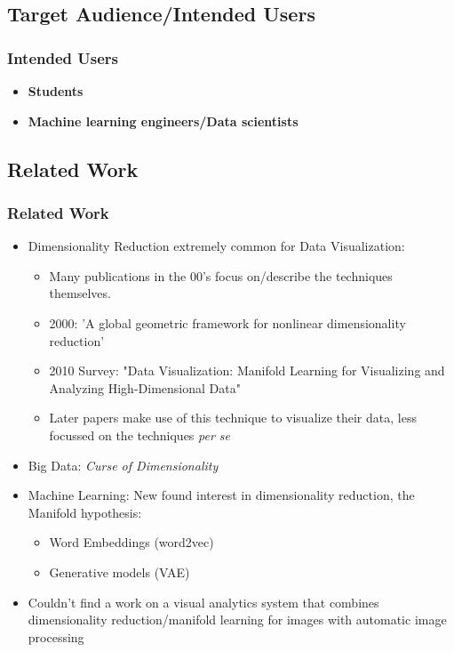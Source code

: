 \documentclass[aspectratio=1610]{beamer}
\begin{document}
\subsection {Target Audience/Intended Users}
\begin{frame}
  \frametitle{Intended Users}

  \begin{itemize}
      \item \textbf{Students} %
      \item \textbf{Machine learning engineers/Data scientists}  %
  \end{itemize}

\end{frame}

\subsection {Related Work}
\begin{frame}
  \frametitle{Related Work}
  \begin{itemize}
    \item Dimensionality Reduction extremely common for Data Visualization: \begin{itemize}
      \item Many publications in the 00's focus on/describe the techniques themselves.
      \item 2000: 'A global geometric framework for nonlinear dimensionality reduction'
      \item 2010 Survey: "Data Visualization: Manifold Learning for Visualizing and Analyzing High-Dimensional Data" 
      \item Later papers make use of this technique to visualize their data, less focussed on the techniques \textit{per se}

    \end{itemize}
    \item Big Data: \textit{Curse of Dimensionality}
    \item Machine Learning: New found interest in dimensionality reduction, the Manifold hypothesis:\begin{itemize}
      \item Word Embeddings (word2vec)
      \item Generative models (VAE)
    \end{itemize}

    \item Couldn't find a work on a visual analytics system that combines dimensionality reduction/manifold learning for images with automatic image processing
  \end{itemize}

\end{frame}
\end{document}
